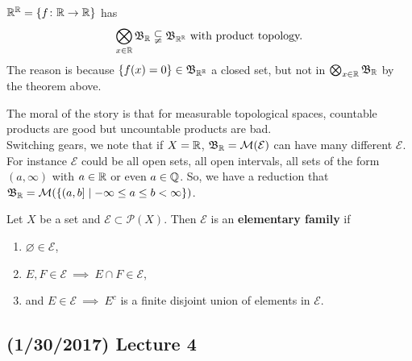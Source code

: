 \documentclass[11pt,leqno,oneside]{amsbook}
\numberwithin{thm}{section}
\renewcommand{\P}{\mathcal{P}} %
\newcommand{\M}{\mathcal{M}} %
\newcommand{\Ep}{\mathcal{E}} %
\renewcommand{\de}{\textbf} %
\begin{document}
\begin{example}
  ${\mathbb R}^{\mathbb R} = \{f\colon  {\mathbb R} \to {\mathbb R}\}$ has \[
    \bigotimes_{x \in {\mathbb R}} \mathfrak{B}_{\mathbb R} \subsetneqq \mathfrak{B}_{{\mathbb R}^{\mathbb R}} \text{ with
      product topology.}
  \]
  The reason is because $\{f(x) = 0\} \in \mathfrak{B}_{{\mathbb R}^{\mathbb R}}$ a closed set,
  but not in $\bigotimes_{x \in {\mathbb R}} \mathfrak{B}_{\mathbb R}$ by the theorem above.
\end{example}
The moral of the story is that for measurable topological spaces,
countable products are good but uncountable products are bad. \\

Switching gears, we note that if $X = {\mathbb R}$, $\B_\R = \M(\Ep)$ can have
many different $\Ep$. For instance $\Ep$ could be all open sets, all
open intervals, all sets of the form $(a, \infty)$ with $a \in {\mathbb R}$ or
even $a \in {\mathbb Q}$. So, we have a reduction that $\B_\R = \M(\{(a,b] \st
-\infty \leq a \leq b < \infty\})$.
\begin{defn}
  Let $X$ be a set and $\Ep \subset \P(X)$. Then $\Ep$ is an
  \de{elementary family} if
  \begin{enumerate}
  \item $\varnothing \in \Ep$,
  \item $E,F \in \Ep \ \implies \ E \cap F \in \Ep$,
  \item and $E \in \Ep \ \implies \ E^c$ is a finite disjoint union of
    elements in $\Ep$.
  \end{enumerate}
\end{defn}
\subsection*{(1/30/2017) Lecture 4}
\end{document}
